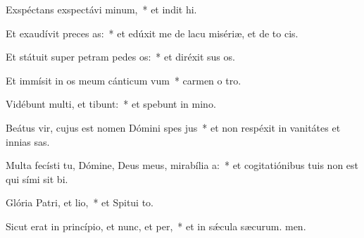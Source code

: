 \item Exspéctans exspectávi minum,~* et indit hi.
\item Et exaudívit preces as:~* et edúxit me de lacu misériæ, et de to cis.
\item Et státuit super petram pedes os:~* et diréxit sus os.
\item Et immísit in os meum cánticum vum~* carmen o tro.
\item Vidébunt multi, et tibunt:~* et spebunt in mino.
\item Beátus vir, cujus est nomen Dómini spes jus~* et non respéxit in vanitátes et innias sas.
\item Multa fecísti tu, Dómine, Deus meus, mirabília a:~* et cogitatiónibus tuis non est qui sími sit bi.
\item Glória Patri, et lio,~* et Spitui to.
\item Sicut erat in princípio, et nunc, et per,~* et in sǽcula sæcurum. men.
